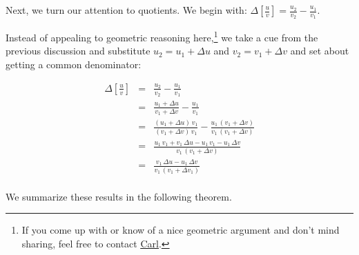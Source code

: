 \documentclass{ximera}
\begin{document}
Next, we turn our attention to quotients.  We begin with: $\Delta \left[ \frac{u}{v} \right] = \frac{u_{2}}{v_{2}}  - \frac{u_{1}}{v_{1}}$.

Instead of appealing to geometric reasoning here,\footnote{If you come up with or know of  a nice geometric argument and don't mind sharing, feel free to contact \href{mailto:carl@stitz-zeager.com}{\underline{Carl}}.} we take a cue from the previous discussion and substitute   $u_{2} = u_{1} + \Delta u$ and $v_{2} = v_{1} + \Delta v$ and set about getting a common denominator:

\[ \begin{array}{rcl}

\Delta\left[ \frac{u}{v}  \right]& = & \frac{u_{2}}{v_{2}} - \frac{u_{1}}{v_{1}}   \\
                       & = &   \frac{ u_{1} + \Delta u}{ v_{1} + \Delta v} - \frac{u_{1}}{v_{1}}  \\
                       & = &   \frac{(u_{1} + \Delta u) \, v_{1}}{(v_{1} + \Delta v) \, v_{1}} - \frac{u_{1} \, (v_{1} + \Delta v)}{v_{1} \,   (v_{1} + \Delta v) }\\  
                            & = &   \frac{u_{1} \, v_{1}  + v_{1} \, \Delta u- u_{1} \, v_{1} - u_{1} \, \Delta v}{v_{1} \,  (v_{1} + \Delta v)}\\   
                         & = &   \frac{ v_{1} \, \Delta u  - u_{1}  \, \Delta v}{v_{1} \,  (v_{1}  + \Delta v_{1})}\\
                       \end{array} \]
                       
We summarize these results in the following theorem.

\end{document}
